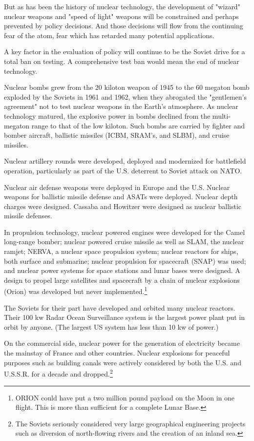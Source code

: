 But as has been the history of nuclear technology, the development of "wizard" nuclear weapons and "speed of light" weapons will be constrained and perhaps prevented by policy decisions. And those decisions will flow from the continuing fear of the atom, fear which has retarded many potential applications.

A key factor in the evaluation of policy will continue to be the Soviet drive for a total ban on testing. A comprehensive test ban would mean the end of nuclear technology.

Nuclear bombs grew from the 20 kiloton weapon of 1945 to the 60 megaton bomb exploded by the Soviets in 1961 and 1962, when they abrogated the "gentlemen's agreement" not to test nuclear weapons in the Earth's atmosphere. As nuclear technology matured, the explosive power in bombs declined from the multi-megaton range to that of the low kiloton. Such bombs are carried by fighter and bomber aircraft, ballistic missiles (ICBM, SRAM's, and SLBM), and cruise missiles.

Nuclear artillery rounds were developed, deployed and modernized for battlefield operation, particularly as part of the U.S. deterrent to Soviet attack on NATO.

Nuclear air defense weapons were deployed in Europe and the U.S. Nuclear weapons for ballistic missile defense and ASATs were deployed. Nuclear depth charges were designed. Cassaba and Howitzer were designed as nuclear ballistic missile defenses.

In propulsion technology, nuclear powered engines were developed for the Camel long-range bomber; nuclear powered cruise missile as well as SLAM, the nuclear ramjet; NERVA, a nuclear space propulsion system; nuclear reactors for ships, both surface and submarine; nuclear propulsion for spacecraft (SNAP) was used; and nuclear power systems for space stations and lunar bases were designed. A design to propel large satellites and spacecraft by a chain of nuclear explosions (Orion) was developed but never implemented.\footnote{
ORION could have put a two million pound payload on the Moon in one flight. This is more than sufficient for a complete Lunar Base.}
 

The Soviets for their part have developed and orbited many nuclear reactors. Their 100 kw Radar Ocean Surveillance system is the largest power plant put in orbit by anyone. (The largest US system has less than 10 kw of power.)

On the commercial side, nuclear power for the generation of electricity became the mainstay of France and other countries. Nuclear explosions for peaceful purposes such as building canals were actively considered by both the U.S. and U.S.S.R. for a decade and dropped.\footnote{
The Soviets seriously considered very large geographical engineering projects such as diversion of north-flowing rivers and the creation of an inland sea.
} 


